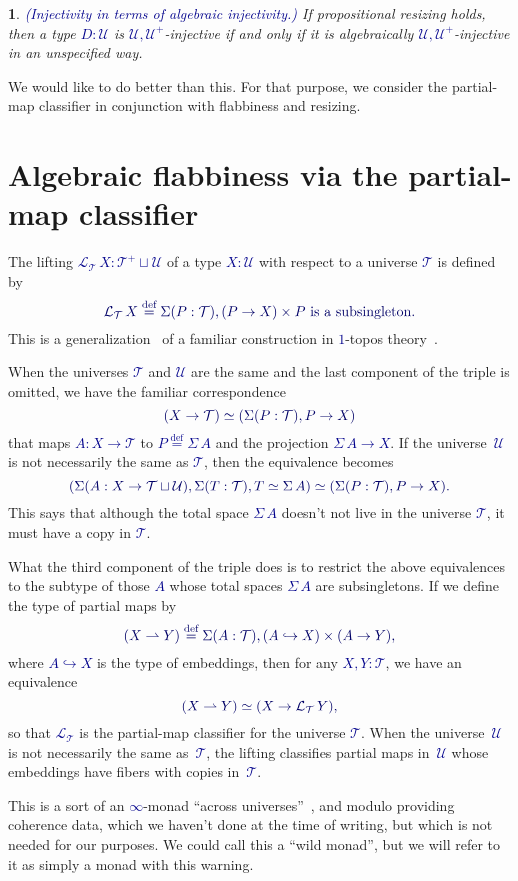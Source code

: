 \documentclass[10pt]{article}
\newcommand{\db}{\textcolor{darkblue}}
\newcommand{\emb}{\hookrightarrow}
\newcommand{\partialto}{\rightharpoonup}
\newcommand{\df}[1]{\emph{\db{#1}}}
\newcommand{\m}[1]{\db{$#1$}}
\newcommand{\M}[1]{\[\db{#1}\]}
\newcommand{\U}{\mathcal{U}}
\newcommand{\T}{\mathcal{T}}
\newcommand{\Lift}{\mathcal{L}}
\newcommand{\eqdef}{\overset{\text{def}}{=}}
\newtheorem{numbered}{}
\theoremstyle{definition}
\begin{document}
\begin{numbered} \label{worse} \df{(Injectivity in terms of algebraic injectivity.)}
  If propositional resizing holds, then a type \m{D : \U} is \m{\U,\U^+}-injective if and only if it is algebraically \m{\U,\U^+}-injective in an unspecified way.
\end{numbered}
\noindent We would like to do better than this. For that purpose, we consider
the partial-map classifier in conjunction with flabbiness and resizing.

\section{Algebraic flabbiness via the partial-map classifier}

The lifting \m{\Lift_{\T} \, X : \T^+ \sqcup \U} of a type \m{X:\U}
with respect to a universe \m{\T} %
is defined by
%
\M{ \Lift_{\T}\, X \eqdef \Sigma (P : \T), (P \to X) \times
  \text{\m{P} is a subsingleton}.  }
%
This is a generalization~\cite{MR3695545} of a familiar construction
in \m{1}-topos theory~\cite{MR1173017}.

When the universes \m{\T} and \m{\U} are the same and the last
component of the triple is omitted, we have the familiar
correspondence
%
\M{
  (X \to \T) \simeq (\Sigma (P : \T), P \to X)
}
%
that maps \m{A : X \to \T} to \m{P \eqdef \Sigma \, A} and the
projection \m{\Sigma \, A \to X}.  If the universe~\m{\U} is not
necessarily the same as \m{\T}, then the equivalence becomes
%
\M{
  (\Sigma (A : X \to \T \sqcup \U), \Sigma(T : \T), T \simeq \Sigma \, A) \simeq (\Sigma (P : \T), P \to X).
}
%
This says that although the total space \m{\Sigma \, A} doesn't not
live in the universe \m{\T}, it must have a copy in \m{\T}.

What the third component of the triple does is to restrict the above
equivalences to the subtype of those \m{A} whose total spaces \m{\Sigma
  \, A} are subsingletons. If we define the type of partial maps by
%
\M{(X \partialto Y) \eqdef \Sigma (A : \T), (A \emb X) \times (A \to Y),
}
%
where \m{A \emb X} is the type of embeddings, then for any \m{X,Y :
  \T}, we have an equivalence
%
\M{
  (X \partialto Y)
  \simeq (X \to \Lift_{\T} \, Y),
}
%
so that \m{\Lift_{\T}} is the partial-map classifier for the universe
\m{\T}.  When the universe~\m{\U} is not necessarily the same
as~\m{\T}, the lifting classifies partial maps in~\m{\U} whose
embeddings have fibers with copies in~\m{\T}.

This is a sort of an \m{\infty}-monad ``across
universes''~\cite{TypeTopology}, and modulo providing coherence data,
which we haven't done at the time of writing, but which is not needed
for our purposes. We could call this a ``wild monad'', but we will
refer to it as simply a monad with this warning.
\end{document}
